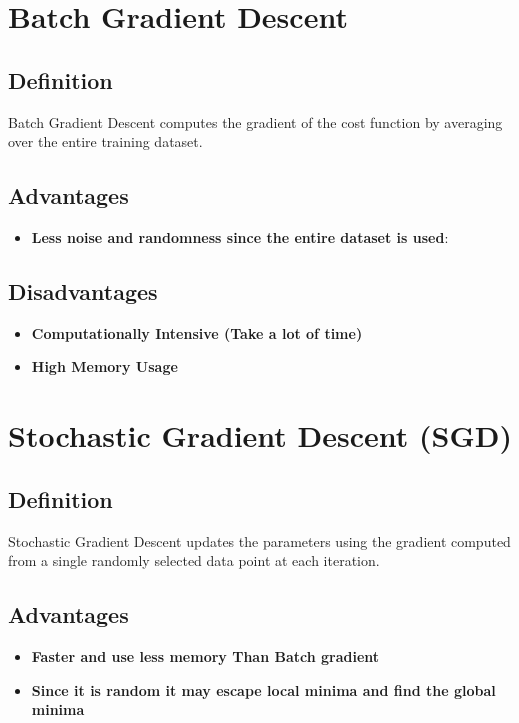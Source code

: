 \documentclass{article}
\begin{document}
\section{Batch Gradient Descent}

\subsection{Definition}

Batch Gradient Descent computes the gradient of the cost function by averaging over the entire training dataset.

\subsection{Advantages}


\begin{itemize}
    \item \textbf{Less noise and randomness since the entire dataset is used}:
\end{itemize}

\subsection{Disadvantages}

\begin{itemize}
    \item \textbf{Computationally Intensive (Take a lot of time)} 
    \item \textbf{High Memory Usage}
\end{itemize}

\section{Stochastic Gradient Descent (SGD)}

\subsection{Definition}

Stochastic Gradient Descent updates the parameters using the gradient computed from a single randomly selected data point at each iteration.

\subsection{Advantages}

\begin{itemize}
    \item \textbf{Faster and use less memory Than Batch gradient}
    \item \textbf{Since it is random it may escape local minima and find the global minima}
\end{itemize}
\end{document}
